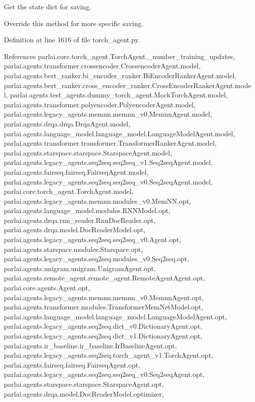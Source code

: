 \begin{DoxyVerb}Get the state dict for saving.

Override this method for more specific saving.
\end{DoxyVerb}
 

Definition at line 1616 of file torch\+\_\+agent.\+py.



References parlai.\+core.\+torch\+\_\+agent.\+Torch\+Agent.\+\_\+number\+\_\+training\+\_\+updates, parlai.\+agents.\+transformer.\+crossencoder.\+Crossencoder\+Agent.\+model, parlai.\+agents.\+bert\+\_\+ranker.\+bi\+\_\+encoder\+\_\+ranker.\+Bi\+Encoder\+Ranker\+Agent.\+model, parlai.\+agents.\+bert\+\_\+ranker.\+cross\+\_\+encoder\+\_\+ranker.\+Cross\+Encoder\+Ranker\+Agent.\+model, parlai.\+agents.\+test\+\_\+agents.\+dummy\+\_\+torch\+\_\+agent.\+Mock\+Torch\+Agent.\+model, parlai.\+agents.\+transformer.\+polyencoder.\+Polyencoder\+Agent.\+model, parlai.\+agents.\+legacy\+\_\+agents.\+memnn.\+memnn\+\_\+v0.\+Memnn\+Agent.\+model, parlai.\+agents.\+drqa.\+drqa.\+Drqa\+Agent.\+model, parlai.\+agents.\+language\+\_\+model.\+language\+\_\+model.\+Language\+Model\+Agent.\+model, parlai.\+agents.\+transformer.\+transformer.\+Transformer\+Ranker\+Agent.\+model, parlai.\+agents.\+starspace.\+starspace.\+Starspace\+Agent.\+model, parlai.\+agents.\+legacy\+\_\+agents.\+seq2seq.\+seq2seq\+\_\+v1.\+Seq2seq\+Agent.\+model, parlai.\+agents.\+fairseq.\+fairseq.\+Fairseq\+Agent.\+model, parlai.\+agents.\+legacy\+\_\+agents.\+seq2seq.\+seq2seq\+\_\+v0.\+Seq2seq\+Agent.\+model, parlai.\+core.\+torch\+\_\+agent.\+Torch\+Agent.\+model, parlai.\+agents.\+legacy\+\_\+agents.\+memnn.\+modules\+\_\+v0.\+Mem\+N\+N.\+opt, parlai.\+agents.\+language\+\_\+model.\+modules.\+R\+N\+N\+Model.\+opt, parlai.\+agents.\+drqa.\+rnn\+\_\+reader.\+Rnn\+Doc\+Reader.\+opt, parlai.\+agents.\+drqa.\+model.\+Doc\+Reader\+Model.\+opt, parlai.\+agents.\+legacy\+\_\+agents.\+seq2seq.\+seq2seq\+\_\+v0.\+Agent.\+opt, parlai.\+agents.\+starspace.\+modules.\+Starspace.\+opt, parlai.\+agents.\+legacy\+\_\+agents.\+seq2seq.\+modules\+\_\+v0.\+Seq2seq.\+opt, parlai.\+agents.\+unigram.\+unigram.\+Unigram\+Agent.\+opt, parlai.\+agents.\+remote\+\_\+agent.\+remote\+\_\+agent.\+Remote\+Agent\+Agent.\+opt, parlai.\+core.\+agents.\+Agent.\+opt, parlai.\+agents.\+legacy\+\_\+agents.\+memnn.\+memnn\+\_\+v0.\+Memnn\+Agent.\+opt, parlai.\+agents.\+transformer.\+modules.\+Transformer\+Mem\+Net\+Model.\+opt, parlai.\+agents.\+language\+\_\+model.\+language\+\_\+model.\+Language\+Model\+Agent.\+opt, parlai.\+agents.\+legacy\+\_\+agents.\+seq2seq.\+dict\+\_\+v0.\+Dictionary\+Agent.\+opt, parlai.\+agents.\+legacy\+\_\+agents.\+seq2seq.\+dict\+\_\+v1.\+Dictionary\+Agent.\+opt, parlai.\+agents.\+ir\+\_\+baseline.\+ir\+\_\+baseline.\+Ir\+Baseline\+Agent.\+opt, parlai.\+agents.\+legacy\+\_\+agents.\+seq2seq.\+torch\+\_\+agent\+\_\+v1.\+Torch\+Agent.\+opt, parlai.\+agents.\+fairseq.\+fairseq.\+Fairseq\+Agent.\+opt, parlai.\+agents.\+legacy\+\_\+agents.\+seq2seq.\+seq2seq\+\_\+v0.\+Seq2seq\+Agent.\+opt, parlai.\+agents.\+starspace.\+starspace.\+Starspace\+Agent.\+opt, parlai.\+agents.\+drqa.\+model.\+Doc\+Reader\+Model.\+optimizer, 